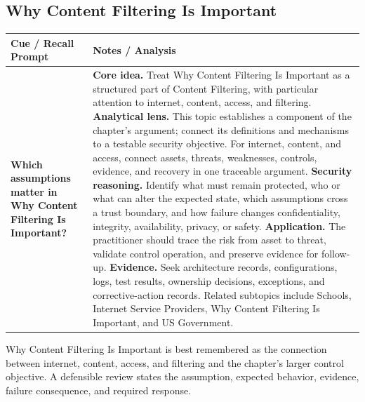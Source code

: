 \documentclass[11pt]{article}
\newcommand{\CornellHeader}{%
\rowcolor{Navy}\color{white}\bfseries Cue / Recall Prompt & \color{white}\bfseries Notes / Analysis\\\hline}
\newcommand{\CornellRow}[2]{%
\cellcolor{CueGray}\RaggedRight\textbf{#1} & \RaggedRight #2\\\hline}
\begin{document}
\subsection*{Why Content Filtering Is Important}
\begin{longtable}{>{\RaggedRight\arraybackslash}p{}|>{\RaggedRight\arraybackslash}p{}}
\CornellHeader
\CornellRow{Which assumptions matter in Why Content Filtering Is Important?}{\textbf{Core idea.} Treat Why Content Filtering Is Important as a structured part of Content Filtering, with particular attention to internet, content, access, and filtering. \textbf{Analytical lens.} This topic establishes a component of the chapter's argument; connect its definitions and mechanisms to a testable security objective. For internet, content, and access, connect assets, threats, weaknesses, controls, evidence, and recovery in one traceable argument. \textbf{Security reasoning.} Identify what must remain protected, who or what can alter the expected state, which assumptions cross a trust boundary, and how failure changes confidentiality, integrity, availability, privacy, or safety. \textbf{Application.} The practitioner should trace the risk from asset to threat, validate control operation, and preserve evidence for follow-up. \textbf{Evidence.} Seek architecture records, configurations, logs, test results, ownership decisions, exceptions, and corrective-action records. Related subtopics include Schools, Internet Service Providers, Why Content Filtering Is Important, and US Government.}
\end{longtable}
\begin{topicsummary}
Why Content Filtering Is Important is best remembered as the connection between internet, content, access, and filtering and the chapter's larger control objective. A defensible review states the assumption, expected behavior, evidence, failure consequence, and required response.
\end{topicsummary}
\end{document}
